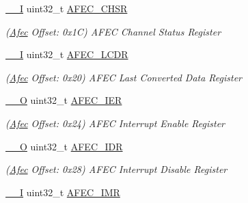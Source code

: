 \begin{DoxyCompactItemize}
\mbox{\hyperlink{core__cm7_8h_af63697ed9952cc71e1225efe205f6cd3}{\+\_\+\+\_\+I}} uint32\+\_\+t \mbox{\hyperlink{structAfec_a07aeeca355ca3abae0ee7195bd406555}{A\+F\+E\+C\+\_\+\+C\+H\+SR}}
\begin{DoxyCompactList}\small\item\em (\mbox{\hyperlink{structAfec}{Afec}} Offset\+: 0x1C) A\+F\+EC Channel Status Register \end{DoxyCompactList}\item 
\mbox{\label{structAfec_a0d1228afdea284396de8b912149ea8ae}} 
\mbox{\hyperlink{core__cm7_8h_af63697ed9952cc71e1225efe205f6cd3}{\+\_\+\+\_\+I}} uint32\+\_\+t \mbox{\hyperlink{structAfec_a0d1228afdea284396de8b912149ea8ae}{A\+F\+E\+C\+\_\+\+L\+C\+DR}}
\begin{DoxyCompactList}\small\item\em (\mbox{\hyperlink{structAfec}{Afec}} Offset\+: 0x20) A\+F\+EC Last Converted Data Register \end{DoxyCompactList}\item 
\mbox{\label{structAfec_a183a66ff6f94f5be0d2eaea0b2ce849a}} 
\mbox{\hyperlink{core__cm7_8h_a7e25d9380f9ef903923964322e71f2f6}{\+\_\+\+\_\+O}} uint32\+\_\+t \mbox{\hyperlink{structAfec_a183a66ff6f94f5be0d2eaea0b2ce849a}{A\+F\+E\+C\+\_\+\+I\+ER}}
\begin{DoxyCompactList}\small\item\em (\mbox{\hyperlink{structAfec}{Afec}} Offset\+: 0x24) A\+F\+EC Interrupt Enable Register \end{DoxyCompactList}\item 
\mbox{\label{structAfec_a16015793734f7be14b2134cfe6d052cd}} 
\mbox{\hyperlink{core__cm7_8h_a7e25d9380f9ef903923964322e71f2f6}{\+\_\+\+\_\+O}} uint32\+\_\+t \mbox{\hyperlink{structAfec_a16015793734f7be14b2134cfe6d052cd}{A\+F\+E\+C\+\_\+\+I\+DR}}
\begin{DoxyCompactList}\small\item\em (\mbox{\hyperlink{structAfec}{Afec}} Offset\+: 0x28) A\+F\+EC Interrupt Disable Register \end{DoxyCompactList}\item 
\mbox{\label{structAfec_abf60f5ce0c0fbbbcdc62d7aa2da419e9}} 
\mbox{\hyperlink{core__cm7_8h_af63697ed9952cc71e1225efe205f6cd3}{\+\_\+\+\_\+I}} uint32\+\_\+t \mbox{\hyperlink{structAfec_abf60f5ce0c0fbbbcdc62d7aa2da419e9}{A\+F\+E\+C\+\_\+\+I\+MR}}

\end{DoxyCompactItemize}
